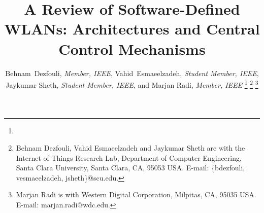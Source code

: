 \documentclass[journal,comsoc]{IEEEtran}
\begin{document}
\twocolumn

\title{{A Review of Software-Defined WLANs: Architectures and Central Control Mechanisms}}
\author{Behnam~Dezfouli, \textit{Member, IEEE}, Vahid~Esmaeelzadeh, \textit{Student Member, IEEE},\\ Jaykumar Sheth, \textit{Student Member, IEEE}, and Marjan Radi, \textit{Member, IEEE}
\thanks{ 
}
\thanks{Behnam Dezfouli, Vahid Esmaeelzadeh and Jaykumar Sheth are with the Internet of Things Research Lab, Department of Computer Engineering, Santa Clara University, Santa Clara, CA, 95053 USA.
E-mail: \{bdezfouli, vesmaeelzadeh, jsheth\}@scu.edu.
}%
\thanks{Marjan Radi is with Western Digital Corporation, Milpitas, CA, 95035 USA. E-mail: {marjan.radi}@wdc.edu.
}%
}


%

\maketitle
\end{document}

